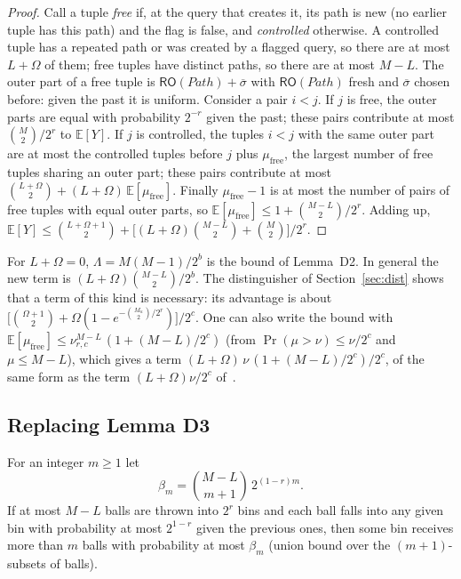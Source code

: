 \documentclass[11pt,a4paper]{article}
\theoremstyle{definition}
\theoremstyle{remark}
\newcommand{\RO}{\mathsf{RO}}
\newcommand{\Path}{\mathit{Path}}
\newcommand{\E}{\mathbb{E}}
\newcommand{\outp}[1]{\overline{#1}}
\begin{document}
\begin{proof}
Call a tuple \emph{free} if, at the query that creates it, its path is new (no earlier tuple has this path) and the
flag is false, and \emph{controlled} otherwise. A controlled tuple has a repeated path or was created by a flagged
query, so there are at most $L + \Omega$ of them; free tuples have distinct paths, so there are at most $M - L$. The outer part of a free tuple is $\RO(\Path) + \outp{\sigma}$
with $\RO(\Path)$ fresh and $\outp{\sigma}$ chosen before: given the past it is uniform. Consider a pair $i < j$.
If $j$ is free, the outer parts are equal with probability $2^{-r}$ given the past; these pairs contribute at most
$\binom{M}{2}/2^r$ to $\E[Y]$. If $j$ is controlled, the tuples $i < j$ with the same outer part are at most the
controlled tuples before $j$ plus $\mu_{\mathrm{free}}$, the largest number of free tuples sharing an outer part; these pairs
contribute at most $\binom{L+\Omega}{2} + (L+\Omega)\,\E[\mu_{\mathrm{free}}]$. Finally $\mu_{\mathrm{free}} - 1$ is at most the number of
pairs of free tuples with equal outer parts, so $\E[\mu_{\mathrm{free}}] \le 1 + \binom{M-L}{2}/2^r$. Adding up,
$\E[Y] \le \binom{L+\Omega+1}{2} + \bigl[(L+\Omega)\binom{M-L}{2} + \binom{M}{2}\bigr]/2^r$.
\end{proof}

For $L + \Omega = 0$, $\Lambda = M(M-1)/2^b$ is the bound of Lemma~D2. In general the new term is
$(L+\Omega)\binom{M-L}{2}/2^b$. The distinguisher of Section~\ref{sec:dist} shows that a term of this kind is necessary:
its advantage is about $\bigl[\binom{\Omega+1}{2} + \Omega(1 - e^{-\binom{M_u}{2}/2^r})\bigr]/2^c$. One can also write the
bound with $\E[\mu_{\mathrm{free}}] \le \nu^{M-L}_{r,c}\,(1 + (M-L)/2^c)$ (from $\Pr(\mu > \nu) \le \nu/2^c$ and $\mu \le M - L$), which gives a
term $(L+\Omega)\,\nu\,(1 + (M-L)/2^c)/2^c$, of the same form as the term $(L+\Omega)\nu/2^c$ of~\cite{DM19}.

\subsection{Replacing Lemma D3}
For an integer $m \ge 1$ let
\[ \beta_m = \binom{M-L}{m+1}\, 2^{(1-r)m} . \]
If at most $M - L$ balls are thrown into $2^r$ bins and each ball falls into any given bin with probability at most
$2^{1-r}$ given the previous ones, then some bin receives more than $m$ balls with probability at most $\beta_m$ (union
bound over the $(m+1)$-subsets of balls).
\end{document}
